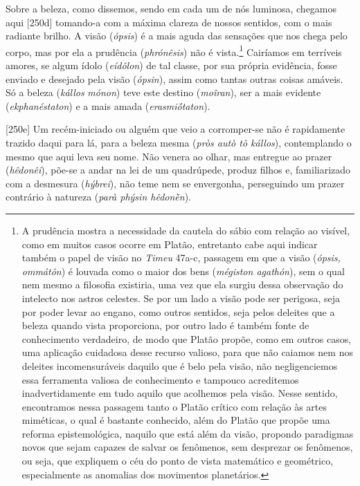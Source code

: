 Sobre a beleza, como dissemos, sendo em cada um de nós luminosa,
chegamos aqui {[}250d{]} tomando-a com a máxima clareza de nossos
sentidos, com o mais radiante brilho. A visão (\emph{ópsis}) é a mais
aguda das sensações que nos chega pelo corpo, mas por ela a prudência
(\emph{phrónêsis}) não é vista.\footnote{A prudência mostra a
  necessidade da cautela do sábio com relação ao visível, como em muitos
  casos ocorre em Platão, entretanto cabe aqui indicar também o papel de
  visão no \emph{Timeu} 47a-c, passagem em que a visão (\emph{ópsis,
  ommátôn}) é louvada como o maior dos bens (\emph{mégiston agathón}),
  sem o qual nem mesmo a filosofia existiria, uma vez que ela surgiu
  dessa observação do intelecto nos astros celestes. Se por um lado a
  visão pode ser perigosa, seja por poder levar ao engano, como outros
  sentidos, seja pelos deleites que a beleza quando vista proporciona,
  por outro lado é também fonte de conhecimento verdadeiro, de modo que
  Platão propõe, como em outros casos, uma aplicação cuidadosa desse
  recurso valioso, para que não caiamos nem nos deleites incomensuráveis
  daquilo que é belo pela visão, não negligenciemos essa ferramenta
  valiosa de conhecimento e tampouco acreditemos inadvertidamente em
  tudo aquilo que acolhemos pela visão. Nesse sentido, encontramos nessa
  passagem tanto o Platão crítico com relação às artes miméticas, o qual
  é bastante conhecido, além do Platão que propõe uma reforma
  epistemológica, naquilo que está além da visão, propondo paradigmas
  novos que sejam capazes de salvar os fenômenos, sem desprezar os
  fenômenos, ou seja, que expliquem o céu do ponto de vista matemático e
  geométrico, especialmente as anomalias dos movimentos planetários.}
Cairíamos em terríveis amores, se algum ídolo (\emph{eídôlon}) de tal
classe, por sua própria evidência, fosse enviado e desejado pela visão
(\emph{ópsin}), assim como tantas outras coisas amáveis. Só a beleza
(\emph{kállos} \emph{mónon}) teve este destino (\emph{moîran}), ser a
mais evidente (\emph{ekphanéstaton}) e a mais amada
(\emph{erasmiṓtaton}).

{[}250e{]} Um recém-iniciado ou alguém que veio a corromper-se não é
rapidamente trazido daqui para lá, para a beleza mesma (\emph{pròs autò
tò kállos}), contemplando o mesmo que aqui leva seu nome. Não venera ao
olhar, mas entregue ao prazer (\emph{hêdonêi}), põe-se a andar na lei de
um quadrúpede, produz filhos e, familiarizado com a desmesura
(\emph{hýbrei}), não teme nem se envergonha, perseguindo um prazer
contrário à natureza (\emph{parà phýsin hêdonḕn}).

